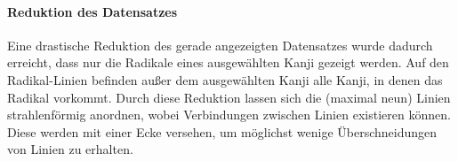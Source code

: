 \paragraph{Reduktion des Datensatzes}
Eine drastische Reduktion des gerade angezeigten Datensatzes wurde dadurch erreicht, dass nur die Radikale eines ausgewählten Kanji gezeigt werden. Auf den Radikal-Linien befinden außer dem ausgewählten Kanji alle Kanji, in denen das Radikal vorkommt. Durch diese Reduktion lassen sich die (maximal neun) Linien strahlenförmig anordnen, wobei Verbindungen zwischen Linien existieren können. Diese werden mit einer Ecke versehen, um möglichst wenige Überschneidungen von Linien zu erhalten. 
